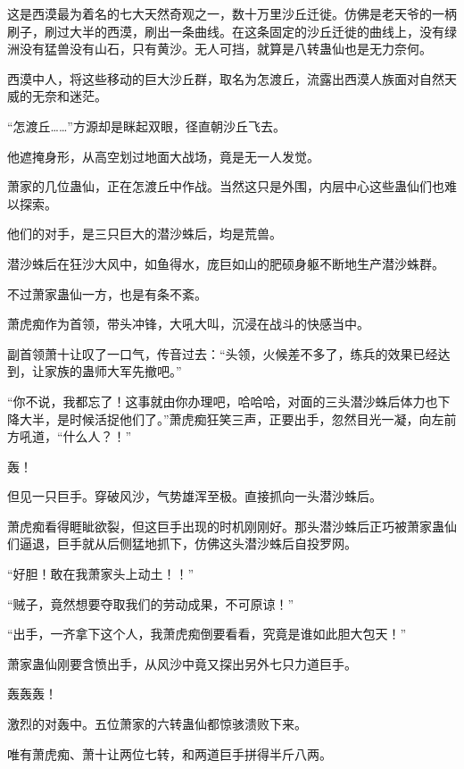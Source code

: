 
\begin{this_body}



这是西漠最为着名的七大天然奇观之一，数十万里沙丘迁徙。仿佛是老天爷的一柄刷子，刷过大半的西漠，刷出一条曲线。在这条固定的沙丘迁徙的曲线上，没有绿洲没有猛兽没有山石，只有黄沙。无人可挡，就算是八转蛊仙也是无力奈何。

西漠中人，将这些移动的巨大沙丘群，取名为怎渡丘，流露出西漠人族面对自然天威的无奈和迷茫。

“怎渡丘……”方源却是眯起双眼，径直朝沙丘飞去。

他遮掩身形，从高空划过地面大战场，竟是无一人发觉。

萧家的几位蛊仙，正在怎渡丘中作战。当然这只是外围，内层中心这些蛊仙们也难以探索。

他们的对手，是三只巨大的潜沙蛛后，均是荒兽。

潜沙蛛后在狂沙大风中，如鱼得水，庞巨如山的肥硕身躯不断地生产潜沙蛛群。

不过萧家蛊仙一方，也是有条不紊。

萧虎痴作为首领，带头冲锋，大吼大叫，沉浸在战斗的快感当中。

副首领萧十让叹了一口气，传音过去：“头领，火候差不多了，练兵的效果已经达到，让家族的蛊师大军先撤吧。”

“你不说，我都忘了！这事就由你办理吧，哈哈哈，对面的三头潜沙蛛后体力也下降大半，是时候活捉他们了。”萧虎痴狂笑三声，正要出手，忽然目光一凝，向左前方吼道，“什么人？！”

轰！

但见一只巨手。穿破风沙，气势雄浑至极。直接抓向一头潜沙蛛后。

萧虎痴看得睚眦欲裂，但这巨手出现的时机刚刚好。那头潜沙蛛后正巧被萧家蛊仙们逼退，巨手就从后侧猛地抓下，仿佛这头潜沙蛛后自投罗网。

“好胆！敢在我萧家头上动土！！”

“贼子，竟然想要夺取我们的劳动成果，不可原谅！”

“出手，一齐拿下这个人，我萧虎痴倒要看看，究竟是谁如此胆大包天！”

萧家蛊仙刚要含愤出手，从风沙中竟又探出另外七只力道巨手。

轰轰轰！

激烈的对轰中。五位萧家的六转蛊仙都惊骇溃败下来。

唯有萧虎痴、萧十让两位七转，和两道巨手拼得半斤八两。


\end{this_body}
